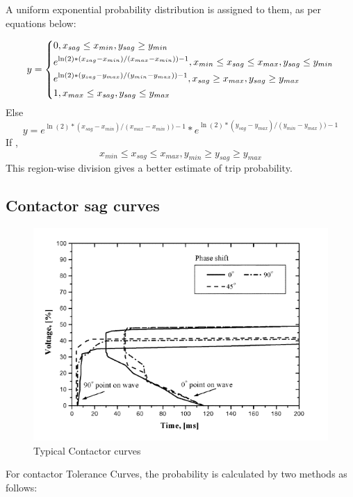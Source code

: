 \documentclass[20pt, a4paper]{report}
\begin{document}
\begin{enumerate}
 A uniform exponential probability distribution is assigned to them, as per equations below: 								
				 
				\begin{equation*}
					y = \begin{dcases}
					0, {x_{sag} \leq x_{min} , y_{sag} \geq y_{min}}\\
					e^{\ln(2)*(x_{sag}-x_{min})/(x_{max}-x_{min}))-1}, 	x_{min} \leq x_{sag} \leq x_{max}, y_{sag} \leq y_{min}\\			
					e^{\ln(2)*(y_{sag}-y_{max})/(y_{min}-y_{max}))-1}, 	x_{sag} \geq x_{max},  y_{sag} \geq y_{max}\\
					1, x_{max} \leq x_{sag}, y_{sag} \leq y_{max}\\		
					\end{dcases}
				\end{equation*}
				\linebreak Else 
				\begin{equation*}
					y = e^{\ln(2)*(x_{sag}-x_{min})/(x_{max}-x_{min}))-1}*e^{\ln(2)*(y_{sag}-y_{max})/(y_{min}-y_{max}))-1}
				\end{equation*}
				If , 	\begin{equation*}
				x_{min} \leq x_{sag} \leq x_{max} , y_{min} \geq y_{sag} \geq y_{max}
				\end{equation*}
				This region-wise division gives a better estimate of trip probability.
				
			\end{enumerate}
			
			\subsection{Contactor sag curves}
			\begin{figure}[!h]
			\centering
			\includegraphics[scale=0.6]{contactor}
			\caption{Typical Contactor curves}
			\label{Contactor_curves}
			\end{figure}
			 For contactor Tolerance Curves, the probability is calculated by two methods as follows:
			 
\end{document}
